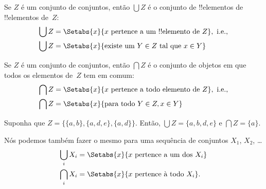 \documentclass[../../../include/open-logic-section]{subfiles}
\begin{document}
\begin{defn}
Se $Z$ é um conjunto de conjuntos, então $\bigcup Z$ é o conjunto de !!{elemento}s de !!{elemento}s de~$Z$:
\begin{align*}
\bigcup Z & = \Setabs{x}{x \text{ pertence a um !!{elemento} de } Z},
\text{ i.e.,}\\
\bigcup Z & = \Setabs{x}{\text{existe um } Y \in Z
  \text{ tal que } x \in Y}
\end{align*}
\end{defn}


\begin{defn}
Se $Z$ é um conjunto de conjuntos, então $\bigcap Z$ é o conjunto de objetos em que todos os elementos de~$Z$ tem em comum:
\begin{align*}
\bigcap Z & = \Setabs{x}{x \text{ pertence a todo elemento de } Z},
\text{ i.e.,}\\
\bigcap Z & = \Setabs{x}{\text{para todo } Y \in Z, x \in Y}
\end{align*}
\end{defn}


\begin{ex}
Suponha que $Z = \{ \{ a, b \}, \{ a, d, e \}, \{ a, d \} \}$.
Então, $\bigcup Z = \{ a, b, d, e \}$ e $\bigcap Z = \{ a \}$.
\end{ex}

Nós podemos também fazer o mesmo para uma sequência de conjuntos $X_1$, $X_2$, \dots
\begin{align*}
\bigcup_i X_i & = \Setabs{x}{x \text{ pertence a um dos } X_i}\\
\bigcap_i X_i & = \Setabs{x}{x \text{ pertence à todo } X_i}.
\end{align*}
\end{document}
